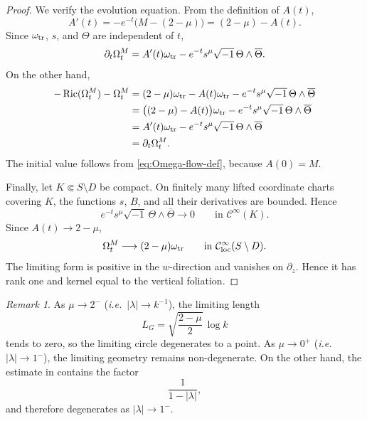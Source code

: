 \documentclass[12pt]{amsart}
\numberwithin{equation}{section}
\theoremstyle{remark}
\newtheorem{remark}{Remark}
\theoremstyle{definition}
\begin{document}
\begin{proof}
We verify the evolution equation. From the definition of $A(t)$,
\begin{equation*}
 A'(t)
 =
 -e^{-t}\bigl(M-(2-\mu)\bigr)
 =
 (2-\mu)-A(t).
\end{equation*}
Since $\omega_{\rm tr}$, $s$, and $\Theta$ are independent of $t$,
\begin{equation*}
 \partial_t\Omega_t^M
 =
 A'(t)\omega_{\rm tr}
 -
 e^{-t}s^\mu\sqrt{-1}\,\Theta\wedge\overline\Theta.
\end{equation*}
On the other hand,
\begin{align*}
 -\operatorname{Ric}(\Omega_t^M)-\Omega_t^M
 &=
 (2-\mu)\omega_{\rm tr}
 -
 A(t)\omega_{\rm tr}
 -
 e^{-t}s^\mu\sqrt{-1}\,\Theta\wedge\overline\Theta \\
 &=
 \bigl((2-\mu)-A(t)\bigr)\omega_{\rm tr}
 -
 e^{-t}s^\mu\sqrt{-1}\,\Theta\wedge\overline\Theta \\
 &= A'(t)\omega_{\rm tr} - e^{-t} s^\mu \sqrt{-1}\,\Theta\wedge\overline\Theta \\
 &= \partial_t\Omega_t^M.
\end{align*}
The initial value follows from \eqref{eq:Omega-flow-def}, because $A(0)=M$.

Finally, let $K\Subset S\setminus D$ be compact. On finitely many lifted
coordinate charts covering $K$, the functions $s$, $B$, and all their
derivatives are bounded. Hence
\begin{equation*}
 e^{-t}s^\mu\sqrt{-1}\,\Theta\wedge\overline\Theta
 \longrightarrow 0
 \qquad
 \text{in }\mathcal C^\infty(K).
\end{equation*}
Since $A(t)\to2-\mu$,
\begin{equation*}
 \Omega_t^M
 \longrightarrow
 (2-\mu)\omega_{\rm tr}
 \qquad
 \text{in }\mathcal C^\infty_{\rm loc}(S\setminus D).
\end{equation*}
The limiting form is positive in the $w$-direction and vanishes on
$\partial_z$. Hence it has rank one and kernel equal to the vertical
foliation.
\end{proof}

 
 \begin{remark}
As $\mu\to2^-$ ({\itshape i.e.}\ $|\lambda|\to k^{-1}$), the limiting length
$$
L_G=\sqrt{\frac{2-\mu}{2}}\,\log k
$$
tends to zero, so the limiting circle degenerates to a point. As $\mu\to0^+$ ({\itshape i.e.}\ $|\lambda|\to1^-$), the limiting geometry remains non-degenerate. On the other hand, the estimate in  contains the factor
$$
\frac{1}{1-|\lambda|},
$$
and therefore degenerates as $|\lambda|\to1^-$.
\end{remark}
 
\end{document}

